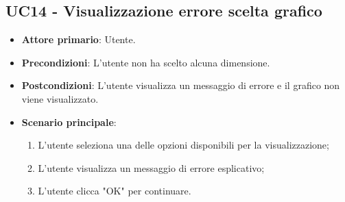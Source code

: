 \subsection{UC14 - Visualizzazione errore scelta grafico}
\begin{itemize}
	\item \textbf{Attore primario}: Utente.
	\item \textbf{Precondizioni}: L'utente non ha scelto alcuna dimensione.
	\item \textbf{Postcondizioni}: L'utente visualizza un messaggio di errore e il grafico non viene visualizzato.
	\item \textbf{Scenario principale}:
		\begin{enumerate}
			\item L'utente seleziona una delle opzioni disponibili per la visualizzazione;
			\item L'utente visualizza un messaggio di errore esplicativo;
			\item L'utente clicca "OK" per continuare.
		\end{enumerate}
\end{itemize}